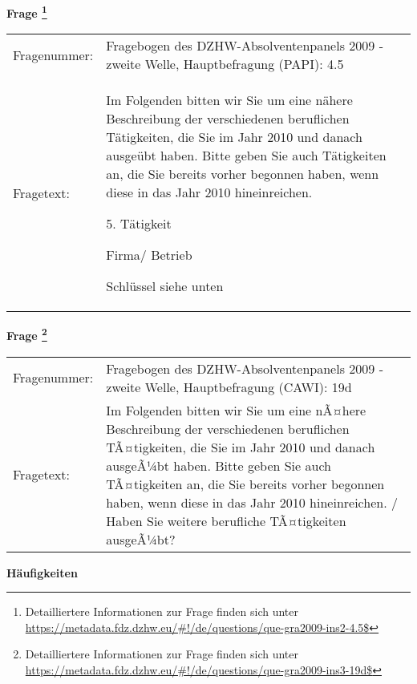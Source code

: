 				\vspace*{0.5cm}
                \noindent\textbf{Frage
	                \footnote{Detailliertere Informationen zur Frage finden sich unter
		              \url{https://metadata.fdz.dzhw.eu/\#!/de/questions/que-gra2009-ins2-4.5$}}}\\
				\begin{tabularx}{\hsize}{@{}lX}
					Fragenummer: &
					  Fragebogen des DZHW-Absolventenpanels 2009 - zweite Welle, Hauptbefragung (PAPI):
					  4.5
 \\
					Fragetext: & Im Folgenden bitten wir Sie um eine nähere Beschreibung der verschiedenen beruflichen Tätigkeiten, die Sie im Jahr 2010 und danach ausgeübt haben. Bitte geben Sie auch Tätigkeiten an, die Sie bereits vorher begonnen haben, wenn diese in das Jahr 2010 hineinreichen.\par  5. Tätigkeit\par  Firma/ Betrieb\par  Schlüssel siehe unten \\
				\end{tabularx}
				\vspace*{0.5cm}
                \noindent\textbf{Frage
	                \footnote{Detailliertere Informationen zur Frage finden sich unter
		              \url{https://metadata.fdz.dzhw.eu/\#!/de/questions/que-gra2009-ins3-19d$}}}\\
				\begin{tabularx}{\hsize}{@{}lX}
					Fragenummer: &
					  Fragebogen des DZHW-Absolventenpanels 2009 - zweite Welle, Hauptbefragung (CAWI):
					  19d
 \\
					Fragetext: & Im Folgenden bitten wir Sie um eine nÃ¤here Beschreibung der verschiedenen beruflichen TÃ¤tigkeiten, die Sie im Jahr 2010 und danach ausgeÃ¼bt haben. Bitte geben Sie auch TÃ¤tigkeiten an, die Sie bereits vorher begonnen haben, wenn diese in das Jahr 2010 hineinreichen. / Haben Sie weitere berufliche TÃ¤tigkeiten ausgeÃ¼bt? \\
				\end{tabularx}





        		\vspace*{0.5cm}
                \noindent\textbf{Häufigkeiten}

